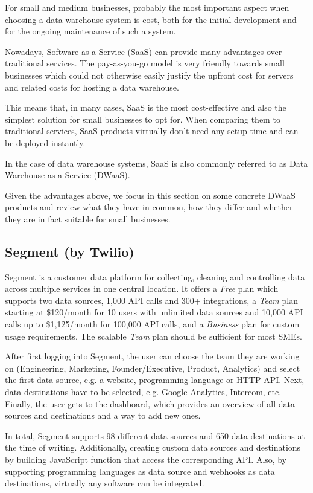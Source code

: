 \documentclass[../paper.tex]{subfiles}
\begin{document}
For small and medium businesses, probably the most important aspect when
choosing a data warehouse system is cost, both for the initial development and
for the ongoing maintenance of such a system.

Nowadays, Software as a Service (SaaS) can provide many advantages over
traditional services. The pay-as-you-go model is very friendly towards small
businesses which could not otherwise easily justify the upfront cost for
servers and related costs for hosting a data warehouse.

This means that, in many cases, SaaS is the most cost-effective and also the
simplest solution for small businesses to opt for. When comparing them to
traditional services, SaaS products virtually don't need any setup time and
can be deployed instantly.

In the case of data warehouse systems, SaaS is also commonly referred to as
Data Warehouse as a Service (DWaaS).

Given the advantages above, we focus in this section on some concrete DWaaS
products and review what they have in common, how they differ and whether they
are in fact suitable for small businesses.

\subsection{Segment (by Twilio)}

Segment is a customer data platform for collecting, cleaning and controlling data across multiple services in one central location. It offers a \textit{Free} plan which supports two data sources, 1,000 API calls and 300+ integrations, a \textit{Team} plan starting at \$120/month for 10 users with unlimited data sources and 10,000 API calls up to \$1,125/month for 100,000 API calls, and a \textit{Business} plan for custom usage requirements. The scalable \textit{Team} plan should be sufficient for most SMEs.

After first logging into Segment, the user can choose the team they are working on (Engineering, Marketing, Founder/Executive, Product, Analytics) and select the first data source, e.g. a website, programming language or HTTP API. Next, data destinations have to be selected, e.g. Google Analytics, Intercom, etc. Finally, the user gets to the dashboard, which provides an overview of all data sources and destinations and a way to add new ones.

In total, Segment supports 98 different data sources and 650 data destinations at the time of writing. Additionally, creating custom data sources and destinations by building JavaScript function that access the corresponding API. Also, by supporting programming languages as data source and webhooks as data destinations, virtually any software can be integrated.
\end{document}

